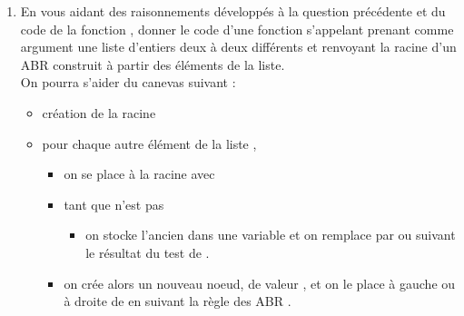 \documentclass[11pt,a4paper,french,twoside]{PMCours}
\begin{document}
\begin{enumerate}
\begin{enumerate}
\begin{multicols}{4}
.\hskip -2cm           
\end{multicols}
Donner l'ABR complet obtenu en ajoutant les noeuds correspondant au reste de la liste.  
\item En vous aidant des raisonnements développés à la question précédente et du code de la fonction , donner le code d'une fonction s'appelant  prenant comme argument une liste d'entiers deux à deux différents  et renvoyant la racine d'un ABR construit à partir des éléments de la liste. \medskip\\ 
On pourra s'aider du canevas suivant : 
\begin{itemize}
\item création de la racine 
\item pour chaque autre élément  de la liste ,
\begin{itemize}
\item on se place à la racine avec 
\item tant que  n'est pas 
\begin{itemize}
\item on stocke l'ancien  dans une variable  et on remplace  par  ou  suivant le résultat du test \code{>}  de .
\end{itemize}
\item on crée alors un nouveau noeud, de valeur , et on le place à gauche ou à droite de  en suivant la règle des ABR .
\end{itemize}
\end{itemize}
\end{enumerate}
\end{enumerate}
\end{document}
